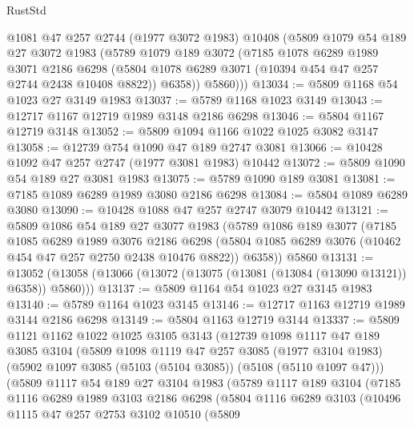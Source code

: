 \begin{lexlean}{RustStd}
\begin{coremodule}
        @1081
        @47
        @257
        @2744
        (@1977 @3072 @1983)
        @10408
        (@5809
          @1079
          @54
          @189
          @27
          @3072
          @1983
          (@5789
            @1079
            @189
            @3072
            (@7185
              @1078
              @6289
              @1989
              @3071
              @2186
              @6298
              (@5804 @1078 @6289 @3071 (@10394 @454 @47 @257 @2744 @2438 @10408 @8822))
              @6358))
          @5860)))
@13034 := @5809 @1168 @54 @1023 @27 @3149 @1983
@13037 := @5789 @1168 @1023 @3149
@13043 := @12717 @1167 @12719 @1989 @3148 @2186 @6298
@13046 := @5804 @1167 @12719 @3148
@13052 := @5809 @1094 @1166 @1022 @1025 @3082 @3147
@13058 := @12739 @754 @1090 @47 @189 @2747 @3081
@13066 := @10428 @1092 @47 @257 @2747 (@1977 @3081 @1983) @10442
@13072 := @5809 @1090 @54 @189 @27 @3081 @1983
@13075 := @5789 @1090 @189 @3081
@13081 := @7185 @1089 @6289 @1989 @3080 @2186 @6298
@13084 := @5804 @1089 @6289 @3080
@13090 := @10428 @1088 @47 @257 @2747 @3079 @10442
@13121 := @5809
    @1086
    @54
    @189
    @27
    @3077
    @1983
    (@5789
      @1086
      @189
      @3077
      (@7185
        @1085
        @6289
        @1989
        @3076
        @2186
        @6298
        (@5804 @1085 @6289 @3076 (@10462 @454 @47 @257 @2750 @2438 @10476 @8822))
        @6358))
    @5860
@13131 := @13052 (@13058 (@13066 (@13072 (@13075 (@13081 (@13084 (@13090 @13121)) @6358)) @5860)))
@13137 := @5809 @1164 @54 @1023 @27 @3145 @1983
@13140 := @5789 @1164 @1023 @3145
@13146 := @12717 @1163 @12719 @1989 @3144 @2186 @6298
@13149 := @5804 @1163 @12719 @3144
@13337 := @5809
    @1121
    @1162
    @1022
    @1025
    @3105
    @3143
    (@12739
      @1098
      @1117
      @47
      @189
      @3085
      @3104
      (@5809
        @1098
        @1119
        @47
        @257
        @3085
        (@1977 @3104 @1983)
        (@5902 @1097 @3085 (@5103 (@5104 @3085)) (@5108 (@5110 @1097 @47)))
        (@5809
          @1117
          @54
          @189
          @27
          @3104
          @1983
          (@5789
            @1117
            @189
            @3104
            (@7185
              @1116
              @6289
              @1989
              @3103
              @2186
              @6298
              (@5804
                @1116
                @6289
                @3103
                (@10496
                  @1115
                  @47
                  @257
                  @2753
                  @3102
                  @10510
                  (@5809

\end{coremodule}
\end{lexlean}
